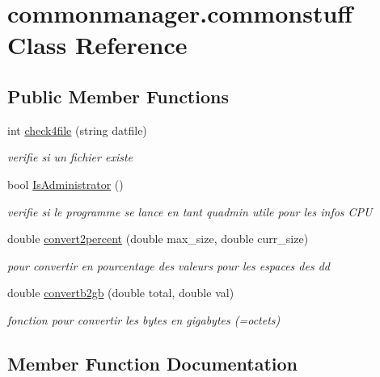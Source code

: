 \hypertarget{classcommonmanager_1_1commonstuff}{}\section{commonmanager.\+commonstuff Class Reference}
\label{classcommonmanager_1_1commonstuff}
\subsection*{Public Member Functions}
\begin{DoxyCompactItemize}
\item 
int \hyperlink{classcommonmanager_1_1commonstuff_ac541bede1f461660549373323c84b44f}{check4file} (string datfile)
\begin{DoxyCompactList}\small\item\em verifie si un fichier existe \end{DoxyCompactList}\item 
bool \hyperlink{classcommonmanager_1_1commonstuff_ace86895848e42a2bea815db15d32837a}{Is\+Administrator} ()
\begin{DoxyCompactList}\small\item\em verifie si le programme se lance en tant qu\textquotesingle{}admin utile pour les infos C\+PU \end{DoxyCompactList}\item 
double \hyperlink{classcommonmanager_1_1commonstuff_ac3d462747c67f057c8b58c5fd278fae0}{convert2percent} (double max\+\_\+size, double curr\+\_\+size)
\begin{DoxyCompactList}\small\item\em pour convertir en pourcentage des valeurs pour les espaces des dd \end{DoxyCompactList}\item 
double \hyperlink{classcommonmanager_1_1commonstuff_a0145bf799146572b168bd53ec1b92643}{convertb2gb} (double total, double val)
\begin{DoxyCompactList}\small\item\em fonction pour convertir les bytes en gigabytes (=octets) \end{DoxyCompactList}\end{DoxyCompactItemize}


\subsection{Member Function Documentation}
\mbox{\label{classcommonmanager_1_1commonstuff_ac541bede1f461660549373323c84b44f}} 
